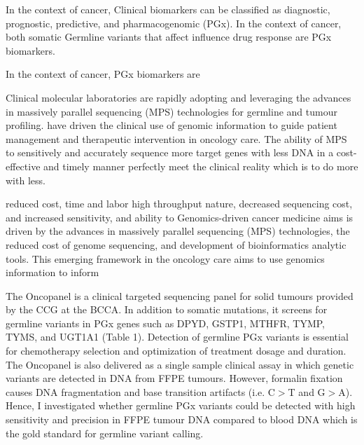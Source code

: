 In the context of cancer,
Clinical biomarkers can be classified as diagnostic, prognostic, predictive, and pharmacogenomic (PGx). In the context of cancer, both somatic Germline variants that affect influence drug response are PGx biomarkers.

In the context of cancer, PGx biomarkers are

Clinical molecular laboratories are rapidly adopting and leveraging the advances in massively parallel sequencing (MPS) technologies for germline and tumour profiling. have driven the clinical use of genomic information to guide patient management and therapeutic intervention in oncology care. The ability of MPS to sensitively and accurately sequence more target genes with less DNA in a cost-effective and timely manner perfectly meet the clinical reality which is to do more with less.

reduced cost, time and labor high throughput nature, decreased sequencing cost, and increased sensitivity, and ability to Genomics-driven cancer medicine aims is driven by the advances in massively parallel sequencing (MPS) technologies, the reduced cost of genome sequencing, and development of bioinformatics analytic tools. This emerging framework in the oncology care aims to use genomics information to inform

The Oncopanel is a clinical targeted sequencing panel for solid tumours provided by the CCG at the BCCA. In addition to somatic mutations, it screens for germline variants in PGx genes such as DPYD, GSTP1, MTHFR, TYMP, TYMS, and UGT1A1 (Table 1). Detection of germline PGx variants is essential for chemotherapy selection and optimization of treatment dosage and duration. The Oncopanel is also delivered as a single sample clinical assay in which genetic variants are detected in DNA from FFPE tumours. However, formalin fixation causes DNA fragmentation and base transition artifacts (i.e. C$>$T and G$>$A). Hence, I investigated whether germline PGx variants could be detected with high sensitivity and precision in FFPE tumour DNA compared to blood DNA which is the gold standard for germline variant calling.
